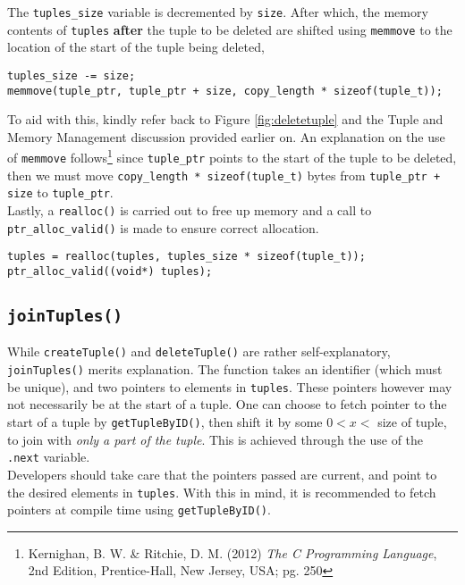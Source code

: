 \documentclass[10pt, a4paper, oneside]{memoir}
\begin{document}
	The \texttt{tuples_size} variable is decremented by \texttt{size}. After which, the memory contents of \texttt{tuples} \textbf{after} the tuple to be deleted are shifted using \texttt{memmove} to the location of the start of the tuple being deleted,
\begin{verbatim}
tuples_size -= size;
memmove(tuple_ptr, tuple_ptr + size, copy_length * sizeof(tuple_t));
\end{verbatim}

	To aid with this, kindly refer back to Figure \ref{fig:deletetuple} and the Tuple and Memory Management discussion provided earlier on. An explanation on the use of \texttt{memmove} follows\footnote{Kernighan, B. W. \& Ritchie, D. M. (2012) \textit{The C Programming Language}, 2nd Edition, Prentice-Hall, New Jersey, USA; pg. 250} since \texttt{tuple_ptr} points to the start of the tuple to be deleted, then we must move \texttt{copy_length * sizeof(tuple_t)} bytes from \texttt{tuple_ptr + size} to \texttt{tuple_ptr}.\\

	Lastly, a \texttt{realloc()} is carried out to free up memory and a call to \texttt{ptr_alloc_valid()} is made to ensure correct allocation.
\begin{verbatim}
tuples = realloc(tuples, tuples_size * sizeof(tuple_t));
ptr_alloc_valid((void*) tuples);
\end{verbatim}

	\subsection{\texttt{joinTuples()}}

	While \texttt{createTuple()} and \texttt{deleteTuple()} are rather self-explanatory, \texttt{joinTuples()} merits explanation. The function takes an identifier (which must be unique), and two pointers to elements in \texttt{tuples}. These pointers however may not necessarily be at the start of a tuple. One can choose to fetch pointer to the start of a tuple by \texttt{getTupleByID()}, then shift it by some $0 < x <$ size of tuple, to join with \textit{only a part of the tuple}. This is achieved through the use of the \texttt{.next} variable.\\
	
	Developers should take care that the pointers passed are current, and point to the desired elements in \texttt{tuples}. With this in mind, it is recommended to fetch pointers at compile time using \texttt{getTupleByID()}.\\
\end{document}
